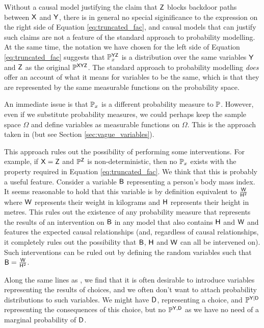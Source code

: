 Without a causal model justifying the claim that $\mathsf{Z}$ blocks backdoor paths between $\mathsf{X}$ and $\mathsf{Y}$, there is in general no special siginificance to the expression on the right side of Equation \ref{eq:truncated_fac}, and causal models that can justify such claims are not a feature of the standard approach to probability modelling. At the same time, the notation we have chosen for the left side of Equation \ref{eq:truncated_fac} suggests that $\mathbb{P}^{\mathsf{YZ}}_{x}$ is a distribution over the same variables $\mathsf{Y}$ and $\mathsf{Z}$ as the original $\mathbb{P}^{\mathsf{XYZ}}$. The standard approach to probability modelling \emph{does} offer an account of what it means for variables to be the same, which is that they are represented by the same measurable functions on the probability space.

An immediate issue is that $\mathbb{P}_x$ is a different probability measure to $\mathbb{P}$. However, even if we substitute probability measures, we could perhaps keep the sample space $\Omega$ and define variables as measurable functions on $\Omega$. This is the approach taken in \citet{pearl_causality:_2009} (but see Section \ref{sec:vague_variables}).

This approach rules out the possibility of performing some interventions. For example, if $\mathsf{X}=\mathsf{Z}$ and $\mathbb{P}^{\mathsf{Z}}$ is non-deterministic, then no $\mathbb{P}_x$ exists with the property required in Equation \ref{eq:truncated_fac}. We think that this is probably a useful feature. Consider a variable $\mathsf{B}$ representing a person's body mass index. It seems reasonable to hold that this variable is by definition equivalent to $\frac{\mathsf{W}}{\mathsf{H}^2}$ where $\mathsf{W}$ represents their weight in kilograms and $\mathsf{H}$ represents their height in metres. This rules out the existence of any probability measure that represents the results of an intervention on $\mathsf{B}$ in any model that also contains $\mathsf{H}$ and $\mathsf{W}$ and features the expected causal relationships (and, regardless of causal relationships, it completely rules out the possibility that $\mathsf{B}$, $\mathsf{H}$ and $\mathsf{W}$ can all be intervened on). Such interventions can be ruled out by defining the random variables such that $\mathsf{B} = \frac{\mathsf{W}}{\mathsf{H}^2}$.

Along the same lines as \citet{dawid_causal_2000}, we find that it is often desirable to introduce variables representing the results of choices, and we often don't want to attach probability distributions to such variables. We might have $\mathsf{D}$, representing a choice, and $\mathbb{P}^{\mathsf{Y}|\mathsf{D}}$ representing the consequences of this choice, but no $\mathbb{P}^{\mathsf{Y},\mathsf{D}}$ as we have no need of a marginal probability of $\mathsf{D}$.

